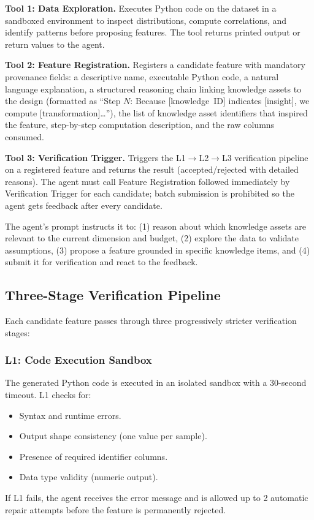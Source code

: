 \textbf{Tool 1: Data Exploration.} Executes Python code on the dataset in a sandboxed environment to inspect distributions, compute correlations, and identify patterns before proposing features. The tool returns printed output or return values to the agent.

\textbf{Tool 2: Feature Registration.} Registers a candidate feature with mandatory provenance fields: a descriptive name, executable Python code, a natural language explanation, a structured reasoning chain linking knowledge assets to the design (formatted as ``Step $N$: Because [knowledge~ID] indicates [insight], we compute [transformation]\ldots''), the list of knowledge asset identifiers that inspired the feature, step-by-step computation description, and the raw columns consumed.

\textbf{Tool 3: Verification Trigger.} Triggers the L1$\to$L2$\to$L3 verification pipeline on a registered feature and returns the result (accepted/rejected with detailed reasons). The agent must call Feature Registration followed immediately by Verification Trigger for each candidate; batch submission is prohibited so the agent gets feedback after every candidate.

The agent's prompt instructs it to:
(1) reason about which knowledge assets are relevant to the current dimension and budget,
(2) explore the data to validate assumptions,
(3) propose a feature grounded in specific knowledge items, and
(4) submit it for verification and react to the feedback.

\subsection{Three-Stage Verification Pipeline}
\label{subsec:verification}

Each candidate feature passes through three progressively stricter verification stages:

\subsubsection{L1: Code Execution Sandbox}
The generated Python code is executed in an isolated sandbox with a 30-second timeout. L1 checks for:
\begin{itemize}
    \item Syntax and runtime errors.
    \item Output shape consistency (one value per sample).
    \item Presence of required identifier columns.
    \item Data type validity (numeric output).
\end{itemize}
If L1 fails, the agent receives the error message and is allowed up to 2 automatic repair attempts before the feature is permanently rejected.

